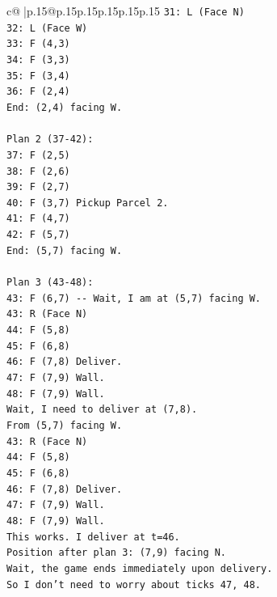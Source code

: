 \documentclass{article}
\begin{document}
{\begin{supertabular}{c@{$\;$}|p{.15\linewidth}@{}p{.15\linewidth}p{.15\linewidth}p{.15\linewidth}p{.15\linewidth}p{.15\linewidth}}
{{{\texttt{31: L (Face N)} \\
\texttt{32: L (Face W)} \\
\texttt{33: F (4,3)} \\
\texttt{34: F (3,3)} \\
\texttt{35: F (3,4)} \\
\texttt{36: F (2,4)} \\
\texttt{End: (2,4) facing W.} \\
\\ 
\texttt{Plan 2 (37{-}42):} \\
\texttt{37: F (2,5)} \\
\texttt{38: F (2,6)} \\
\texttt{39: F (2,7)} \\
\texttt{40: F (3,7) Pickup Parcel 2.} \\
\texttt{41: F (4,7)} \\
\texttt{42: F (5,7)} \\
\texttt{End: (5,7) facing W.} \\
\\ 
\texttt{Plan 3 (43{-}48):} \\
\texttt{43: F (6,7) {-}{-} Wait, I am at (5,7) facing W.} \\
\texttt{43: R (Face N)} \\
\texttt{44: F (5,8)} \\
\texttt{45: F (6,8)} \\
\texttt{46: F (7,8) Deliver.} \\
\texttt{47: F (7,9) Wall.} \\
\texttt{48: F (7,9) Wall.} \\
\texttt{Wait, I need to deliver at (7,8).} \\
\texttt{From (5,7) facing W.} \\
\texttt{43: R (Face N)} \\
\texttt{44: F (5,8)} \\
\texttt{45: F (6,8)} \\
\texttt{46: F (7,8) Deliver.} \\
\texttt{47: F (7,9) Wall.} \\
\texttt{48: F (7,9) Wall.} \\
\texttt{This works. I deliver at t=46.} \\
\texttt{Position after plan 3: (7,9) facing N.} \\
\texttt{Wait, the game ends immediately upon delivery.} \\
\texttt{So I don't need to worry about ticks 47, 48.} \\
}}}
\end{supertabular}}
\end{document}
